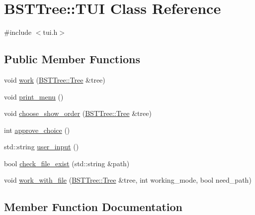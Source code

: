 \hypertarget{class_b_s_t_tree_1_1_t_u_i}{}\section{B\+S\+T\+Tree\+:\+:T\+UI Class Reference}
\label{class_b_s_t_tree_1_1_t_u_i}


{\ttfamily \#include $<$tui.\+h$>$}

\subsection*{Public Member Functions}
\begin{DoxyCompactItemize}
\item 
void \mbox{\hyperlink{class_b_s_t_tree_1_1_t_u_i_afe4974e135f19675c0d7a399569d0260}{work}} (\mbox{\hyperlink{class_b_s_t_tree_1_1_tree}{B\+S\+T\+Tree\+::\+Tree}} \&tree)
\item 
void \mbox{\hyperlink{class_b_s_t_tree_1_1_t_u_i_a36a4e9973e0f541ee62c60f6adfa1e4b}{print\+\_\+menu}} ()
\item 
void \mbox{\hyperlink{class_b_s_t_tree_1_1_t_u_i_a75de3c6d3f470061d6e18b85fd11c664}{choose\+\_\+show\+\_\+order}} (\mbox{\hyperlink{class_b_s_t_tree_1_1_tree}{B\+S\+T\+Tree\+::\+Tree}} \&tree)
\item 
int \mbox{\hyperlink{class_b_s_t_tree_1_1_t_u_i_a055abf843e4d04bf44dea3238be2541f}{approve\+\_\+choice}} ()
\item 
std\+::string \mbox{\hyperlink{class_b_s_t_tree_1_1_t_u_i_a3527b06df46672627360a856068cc208}{user\+\_\+input}} ()
\item 
bool \mbox{\hyperlink{class_b_s_t_tree_1_1_t_u_i_a94ba27753d99a4e2e419777bca7a92d7}{check\+\_\+file\+\_\+exist}} (std\+::string \&path)
\item 
void \mbox{\hyperlink{class_b_s_t_tree_1_1_t_u_i_a8fd19902f1902a50ffd94493f4f3b538}{work\+\_\+with\+\_\+file}} (\mbox{\hyperlink{class_b_s_t_tree_1_1_tree}{B\+S\+T\+Tree\+::\+Tree}} \&tree, int working\+\_\+mode, bool need\+\_\+path)
\end{DoxyCompactItemize}


\subsection{Member Function Documentation}
\mbox{\label{class_b_s_t_tree_1_1_t_u_i_a055abf843e4d04bf44dea3238be2541f}} 
